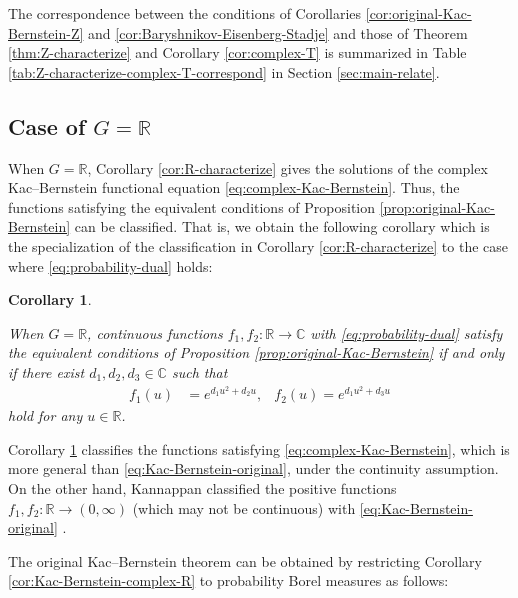 \documentclass[12pt]{article}
\newtheorem{corollary}[theorem]{Corollary}
\theoremstyle{definition}
\theoremstyle{remark}
\numberwithin{equation}{section}
\numberwithin{figure}{section}
\numberwithin{table}{section}
\begin{document}
The correspondence between the conditions of Corollaries \ref{cor:original-Kac-Bernstein-Z} and \ref{cor:Baryshnikov-Eisenberg-Stadje} and those of Theorem \ref{thm:Z-characterize} and Corollary \ref{cor:complex-T} is summarized in Table \ref{tab:Z-characterize-complex-T-correspond} in Section \ref{sec:main-relate}.

\subsection{Case of \texorpdfstring{$ G = \mathbb{ R } $}{G = R}}
\label{subsec:Kac-Bernstein-probability-R}

When $ G = \mathbb{ R } $, Corollary \ref{cor:R-characterize} gives the solutions of the complex Kac--Bernstein functional equation \eqref{eq:complex-Kac-Bernstein}.
Thus, the functions satisfying the equivalent conditions of Proposition \ref{prop:original-Kac-Bernstein} can be classified.
That is, we obtain the following corollary which is the specialization of the classification in Corollary \ref{cor:R-characterize} to the case where \eqref{eq:probability-dual} holds:

\begin{corollary}
    \label{cor:original-Kac-Bernstein-R}

When $ G = \mathbb{ R } $, continuous functions $ f_1 , f_2 \colon \mathbb{ R } \to \mathbb{ C } $ with \eqref{eq:probability-dual} satisfy the equivalent conditions of Proposition \ref{prop:original-Kac-Bernstein} if and only if there exist $ d_1 , d_2 , d_3 \in \mathbb{ C } $ such that
\begin{align}
    f_1 ( u ) & = e^{ d_1 u^2 + d_2 u }, &
    f_2 ( u ) = e^{ d_1 u^2 + d_3 u } 
\end{align}
hold for any $ u \in \mathbb{ R } $.
    
\end{corollary}

Corollary \ref{cor:original-Kac-Bernstein-R} classifies the functions satisfying \eqref{eq:complex-Kac-Bernstein}, which is more general than \eqref{eq:Kac-Bernstein-original}, under the continuity assumption.
On the other hand, Kannappan classified the positive functions $ f_1 , f_2 \colon \mathbb{ R } \to ( 0 , \infty ) $ (which may not be continuous) with \eqref{eq:Kac-Bernstein-original} \cite[Corollary 1]{MR1792081}.

The original Kac--Bernstein theorem can be obtained by restricting Corollary \ref{cor:Kac-Bernstein-complex-R} to probability Borel measures as follows:
\end{document}
